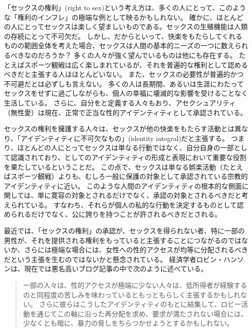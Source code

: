 \documentclass[paper=a4,book,openany]{jlreq} \usepackage{mystyle}
\begin{document}
「セックスの権利」(right to sex)という考え方は、多くの人にとって、このような「権利のインフレ」の極端な例として映るかもしれない。
確かに、ほとんどの人にとってセックスは楽しく望ましいものである。セックスの生殖機能は人類の存続にとって不可欠だ。
しかし、だからといって、快楽をもたらしてくれるものの範囲全体を考えた場合、セックスは人間の基本的ニーズの一つに数えられるべきなのだろうか？  多くの人々が強く望んでいるものは他にも存在する。
たとえばスポーツ観戦は広く楽しまれているが、それを普遍的な権利として認めるべきだと主張する人はほとんどいない。
また、セックスの必要性が普遍的かつ不可避だとは必ずしも言えない。
多くの人は長期間、あるいは生涯にわたってセックスをせずに過ごしながらも、個人の幸福に壊滅的な影響を受けることなく生活している。
さらに、自分をと定義する人々もおり、アセクシュアリティ（無性愛）は現在、正常で正当な性的アイデンティティとして承認されている。

セックスの権利を擁護する人々は、セックスが他の快楽をもたらす活動とは異なり、「アイデンティティに不可欠なもの」(identity integral)だと主張する。
つまり、ほとんどの人にとってセックスは単なる行動ではなく、自分自身の一部として認識されており、としてのアイデンティティの形成と表現において重要な役割を果たしているということだ。
この点で、セックスは単なる娯楽活動（たとえばスポーツ観戦）よりも、むしろ一般に保護の対象として承認されている宗教的アイデンティティに近い。
このような人間のアイデンティティの根本的な側面に関しては、単に寛容の対象とされるだけでなく、承認の対象とされるべきだと考えられている。
すなわち、それらが個人の私的な行動を決定するものとして認められるだけでなく、公に誇りを持つことが許されるべきだとされる。

最近では、「セックスの権利」の承認が、セックスを得られない者、特に一部の男性が、それを提供される権利をもっていると主張することにつながるのではないか、さらには極端な場合には、女性への性的アクセスが均等に分配されるべきだという主張を生むのではないかと懸念されている。
経済学者ロビン・ハンソンは、現在では悪名高いブログ記事の中で次のように述べている。

\begin{quote}
一部の人々は、性的アクセスが極端に少ない人々は、低所得者が経験するのと同程度の苦しみを味わっているともっともらしく主張するかもしれない。
さらに彼らはこうしたアイデンティティのもとに結集して、ロビー活動を通じてこの軸に沿った再分配を求め、要求が満たされない場合には、少なくとも暗に、暴力の脅しをちらつかせようとするかもしれない。
\citep{hanson18:_two_types_envy}
\end{quote}
\end{document}
